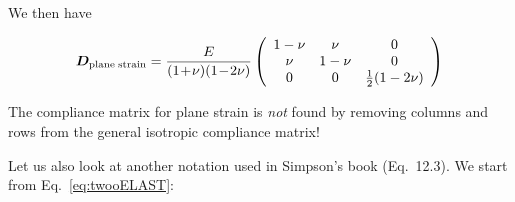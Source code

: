 We then have
\begin{mdframed}[backgroundcolor=blue!5]
\begin{equation}
{\bm D}_{\rm plane \; strain} = \frac{E}{(1\!+\!\nu)(1\!-\!2\nu)}
\left(
\begin{array}{ccc}
1-\nu & \nu & 0  \\
\nu & 1-\nu & 0 \\
0 & 0 & \frac12(1-2\nu)
\end{array}
\right)
\label{eq:D_pstrain}
\end{equation}
\end{mdframed}

\begin{remark}
The compliance matrix for plane strain is {\it not} found by removing columns and rows from the general isotropic compliance matrix!
\end{remark}

Let us also look at another notation used in Simpson's book \cite{simp17} (Eq.~12.3). We start from Eq.~\eqref{eq:twooELAST}:

